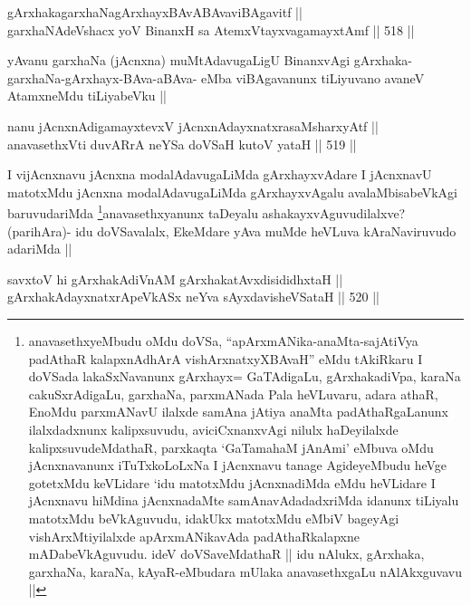 
\begin{shl}
gArxhakagarxhaNagArxhayxBAvABAvaviBAgavitf || \\
garxhaNAdeVshacx yoV BinanxH sa AtemxVtayxvagamayxtAmf ||  518 ||  
\end{shl}

\begin{artha}
yAvanu garxhaNa (jAcnxna) muMtAdavugaLigU BinanxvAgi gArxhaka-garxhaNa-gArxhayx-BAva-aBAva- eMba viBAgavanunx tiLiyuvano avaneV AtamxneMdu tiLiyabeVku ||
\end{artha}


\begin{shl}
nanu jAcnxnAdigamayxtevxV jAcnxnAdayxnatxrasaMsharxyAtf || \\
anavasethxVti duvARrA neYSa doVSaH kutoV yataH ||  519 ||  
\end{shl}

\begin{artha}
I vijAcnxnavu jAcnxna modalAdavugaLiMda gArxhayxvAdare I jAcnxnavU matotxMdu jAcnxna modalAdavugaLiMda gArxhayxvAgalu avalaMbisabeVkAgi baruvudariMda \footnote{anavasethxyeMbudu oMdu doVSa, ``apArxmANika-anaMta-sajAtiVya padAthaR kalapxnAdhArA vishArxnatxyXBAvaH'' eMdu tAkiRkaru I doVSada lakaSxNavanunx gArxhayx= GaTAdigaLu, gArxhakadiVpa, karaNa cakuSxrAdigaLu, garxhaNa, parxmANada Pala heVLuvaru, adara athaR, EnoMdu parxmANavU ilalxde samAna jAtiya anaMta padAthaRgaLanunx ilalxdadxnunx kalipxsuvudu, aviciCxnanxvAgi nilulx haDeyilalxde kalipxsuvudeMdathaR, parxkaqta `GaTamahaM jAnAmi' eMbuva oMdu jAcnxnavanunx iTuTxkoLoLxNa I jAcnxnavu tanage AgideyeMbudu heVge gotetxMdu keVLidare `idu matotxMdu jAcnxnadiMda eMdu heVLidare I jAcnxnavu hiMdina jAcnxnadaMte samAnavAdadadxriMda idanunx tiLiyalu matotxMdu beVkAguvudu, idakUkx matotxMdu eMbiV bageyAgi vishArxMtiyilalxde apArxmANikavAda padAthaRkalapxne mADabeVkAguvudu. ideV doVSaveMdathaR || idu nAlukx, gArxhaka, garxhaNa, karaNa, kAyaR-eMbudara mUlaka anavasethxgaLu nAlAkxguvavu ||}anavasethxyanunx taDeyalu ashakayxvAguvudilalxve? (parihAra)- idu doVSavalalx, EkeMdare yAva muMde heVLuva kAraNaviruvudo adariMda ||
\end{artha}

\begin{shl}
savxtoV hi gArxhakAdiVnAM gArxhakatAvxdisididhxtaH ||  \\
gArxhakAdayxnatxrApeVkASx neYva sAyxdavisheVSataH ||  520 ||  
\end{shl}


